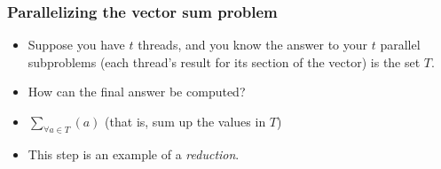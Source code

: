 \documentclass[table]{beamer}
\begin{document}
\begin{frame}
    \frametitle{Parallelizing the vector sum problem}
    \begin{itemize}
        \item<1-> Suppose you have $t$ threads, and you know the answer to 
        your $t$ parallel subproblems (each thread's result for its section 
        of the vector) is the set $T$.
        \item<2-> How can the final answer be computed?
        \item<4-> $\sum_{\forall a\in T}(a)$ (that is, sum up the values in
        $T$)
        \item<5-> This step is an example of a \emph{reduction}.
    \end{itemize}
\end{frame}
\end{document}
